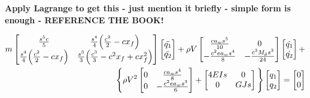 \documentclass[11pt]{article}
\begin{document}
\textbf{Apply Lagrange to get this - just mention it briefly - simple form is enough - REFERENCE THE BOOK!}

\begin{equation}\label{eq:full-aeroe}
\begin{gathered}
\begin{split}
    m\begin{bmatrix} \frac{s^5c}{5} & \frac{s^4}{4}\Big{(}\frac{c^2}{2}-cx_f\Big{)} \\ \frac{s^4}{4}\Big{(}\frac{c^2}{2}-cx_f\Big{)} & \frac{s^3}{3}\Big{(}\frac{c^3}{3}-c^2x_f+cx_f^2\Big{)} \end{bmatrix} \begin{bmatrix}\ddot{q_1}\\ \ddot{q_2} \end{bmatrix} + \rho V \begin{bmatrix} \frac{ca_w s^5}{10} & 0 \\ -\frac{c^2e a_w s^4}{8} & -\frac{c^3M_{\dot\theta}s^3}{24} \end{bmatrix}\begin{bmatrix}\dot{q_1}\\ \dot{q_2}\end{bmatrix} +\\ \Bigg{\{}\rho V^2  \begin{bmatrix} 0 & \frac{ca_ws^4}{8} \\ 0 & -\frac{c^2ea_ws^3}{6} \end{bmatrix} + \begin{bmatrix} 4EIs & 0 \\ 0 & GJs \end{bmatrix} \Bigg{\}}\begin{bmatrix} q_1 \\ q_2 \end{bmatrix} = \begin{bmatrix} 0 \\ 0 \end{bmatrix}
\end{split}
\end{gathered}
\end{equation}



\end{document}
